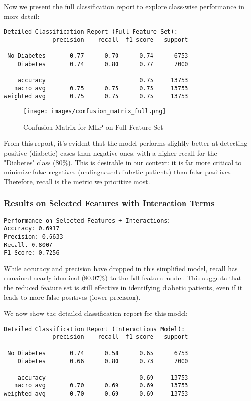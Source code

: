 \vspace{0.5em}
\noindent
Now we present the full classification report to explore class-wise performance in more detail:

\begin{verbatim}
Detailed Classification Report (Full Feature Set):
              precision    recall  f1-score   support

 No Diabetes       0.77      0.70      0.74      6753
    Diabetes       0.74      0.80      0.77      7000

    accuracy                           0.75     13753
   macro avg       0.75      0.75      0.75     13753
weighted avg       0.75      0.75      0.75     13753
\end{verbatim}

\begin{figure}[H]
    \centering
    \texttt{[image: images/confusion\_matrix\_full.png]}
    \caption{Confusion Matrix for MLP on Full Feature Set}
\end{figure}

\noindent
From this report, it's evident that the model performs slightly better at detecting positive (diabetic) cases than negative ones, with a higher recall for the "Diabetes" class (80\%). This is desirable in our context: it is far more critical to minimize false negatives (undiagnosed diabetic patients) than false positives. Therefore, recall is the metric we prioritize most.

\subsubsection{Results on Selected Features with Interaction Terms}

\begin{verbatim}
Performance on Selected Features + Interactions:
Accuracy: 0.6917
Precision: 0.6633
Recall: 0.8007
F1 Score: 0.7256
\end{verbatim}

\noindent
While accuracy and precision have dropped in this simplified model, recall has remained nearly identical (80.07\%) to the full-feature model. This suggests that the reduced feature set is still effective in identifying diabetic patients, even if it leads to more false positives (lower precision).

\vspace{0.5em}
\noindent
We now show the detailed classification report for this model:

\begin{verbatim}
Detailed Classification Report (Interactions Model):
              precision    recall  f1-score   support

 No Diabetes       0.74      0.58      0.65      6753
    Diabetes       0.66      0.80      0.73      7000

    accuracy                           0.69     13753
   macro avg       0.70      0.69      0.69     13753
weighted avg       0.70      0.69      0.69     13753
\end{verbatim}

